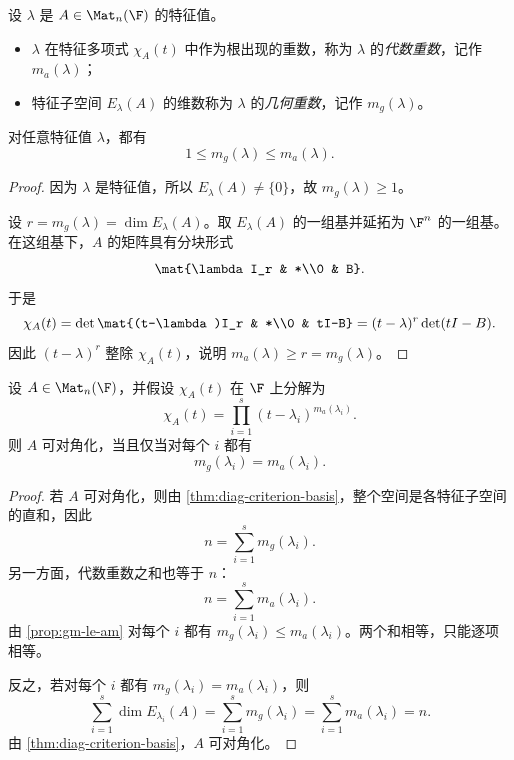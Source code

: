 \begin{definition}
设 \(\lambda\) 是 \(A\in \Mat_n(\F)\) 的特征值。
\begin{itemize}
  \item \(\lambda\) 在特征多项式 \(\chi_A(t)\) 中作为根出现的重数，称为 \(\lambda\) 的\emph{代数重数}，记作 \(m_a(\lambda)\)；
  \item 特征子空间 \(E_\lambda(A)\) 的维数称为 \(\lambda\) 的\emph{几何重数}，记作 \(m_g(\lambda)\)。
\end{itemize}
\end{definition}

\begin{proposition}\label{prop:gm-le-am}
对任意特征值 \(\lambda\)，都有
\[
1\le m_g(\lambda)\le m_a(\lambda).
\]
\end{proposition}

\begin{proof}
因为 \(\lambda\) 是特征值，所以 \(E_\lambda(A)\neq\{0\}\)，故 \(m_g(\lambda)\ge 1\)。

设 \(r=m_g(\lambda)=\dim E_\lambda(A)\)。取 \(E_\lambda(A)\) 的一组基并延拓为 \(\F^n\) 的一组基。在这组基下，\(A\) 的矩阵具有分块形式
\[
\mat{\lambda I_r & *\\0 & B}.
\]
于是
\[
\chi_A(t)=\det\mat{(t-\lambda)I_r & *\\0 & tI-B}
=(t-\lambda)^r\det(tI-B).
\]
因此 \((t-\lambda)^r\) 整除 \(\chi_A(t)\)，说明 \(m_a(\lambda)\ge r=m_g(\lambda)\)。
\end{proof}

\begin{theorem}\label{thm:diag-am-gm}
设 \(A\in \Mat_n(\F)\)，并假设 \(\chi_A(t)\) 在 \(\F\) 上分解为
\[
\chi_A(t)=\prod_{i=1}^s (t-\lambda_i)^{m_a(\lambda_i)}.
\]
则 \(A\) 可对角化，当且仅当对每个 \(i\) 都有
\[
m_g(\lambda_i)=m_a(\lambda_i).
\]
\end{theorem}

\begin{proof}
若 \(A\) 可对角化，则由 \cref{thm:diag-criterion-basis}，整个空间是各特征子空间的直和，因此
\[
n=\sum_{i=1}^s m_g(\lambda_i).
\]
另一方面，代数重数之和也等于 \(n\)：
\[
n=\sum_{i=1}^s m_a(\lambda_i).
\]
由 \cref{prop:gm-le-am} 对每个 \(i\) 都有 \(m_g(\lambda_i)\le m_a(\lambda_i)\)。两个和相等，只能逐项相等。

反之，若对每个 \(i\) 都有 \(m_g(\lambda_i)=m_a(\lambda_i)\)，则
\[
\sum_{i=1}^s \dim E_{\lambda_i}(A)=\sum_{i=1}^s m_g(\lambda_i)=\sum_{i=1}^s m_a(\lambda_i)=n.
\]
由 \cref{thm:diag-criterion-basis}，\(A\) 可对角化。
\end{proof}

